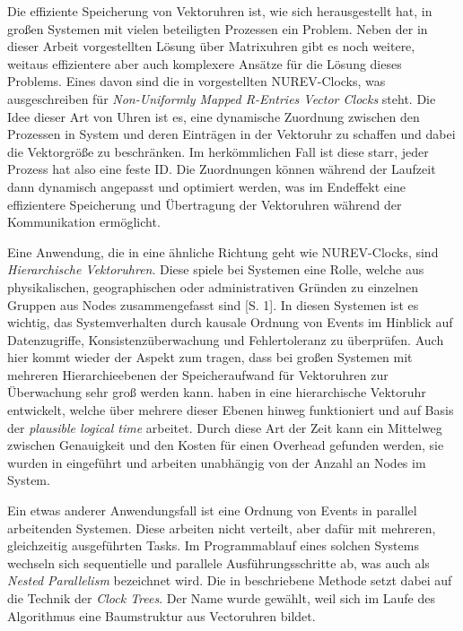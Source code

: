 Die effiziente Speicherung von Vektoruhren ist, wie sich herausgestellt hat, in großen Systemen mit vielen beteiligten Prozessen ein Problem. Neben der in dieser Arbeit vorgestellten Lösung über Matrixuhren gibt es noch weitere, weitaus effizientere aber auch komplexere Ansätze für die Lösung dieses Problems. Eines davon sind die in \cite{Gidenstam2004} vorgestellten NUREV-Clocks, was ausgeschreiben für \textit{Non-Uniformly Mapped R-Entries Vector Clocks} steht. Die Idee dieser Art von Uhren ist es, eine dynamische Zuordnung zwischen den Prozessen in System und deren Einträgen in der Vektoruhr zu schaffen und dabei die Vektorgröße zu beschränken. Im herkömmlichen Fall ist diese starr, jeder Prozess hat also eine feste ID. Die Zuordnungen können während der Laufzeit dann dynamisch angepasst und optimiert werden, was im Endeffekt eine effizientere Speicherung und Übertragung der Vektoruhren während der Kommunikation ermöglicht.

Eine Anwendung, die in eine ähnliche Richtung geht wie NUREV-Clocks, sind \textit{Hierarchische Vektoruhren}. Diese spiele bei Systemen eine Rolle, welche aus physikalischen, geographischen oder administrativen Gründen zu einzelnen Gruppen aus Nodes zusammengefasst sind \cite{Khotimsky1999}[S. 1]. In diesen Systemen ist es wichtig, das Systemverhalten durch kausale Ordnung von Events im Hinblick auf Datenzugriffe, Konsistenzüberwachung und Fehlertoleranz zu überprüfen. Auch hier kommt wieder der Aspekt zum tragen, dass bei großen Systemen mit mehreren Hierarchieebenen der Speicheraufwand für Vektoruhren zur Überwachung sehr groß werden kann.  haben in  \cite{Khotimsky1999} eine hierarchische Vektoruhr entwickelt, welche über mehrere dieser Ebenen hinweg funktioniert und auf Basis der \textit{plausible logical time} arbeitet. Durch diese Art der Zeit kann ein Mittelweg zwischen Genauigkeit und den Kosten für einen Overhead gefunden werden, sie wurden in \cite{torres1999plausible} eingeführt und arbeiten unabhängig von der Anzahl an Nodes im System.

Ein etwas anderer Anwendungsfall ist eine Ordnung von Events in parallel arbeitenden Systemen. Diese arbeiten nicht verteilt, aber dafür mit mehreren, gleichzeitig ausgeführten Tasks. Im Programmablauf eines solchen Systems wechseln sich sequentielle und parallele Ausführungsschritte ab, was auch als \textit{Nested Parallelism} bezeichnet wird. Die in \cite{Audenaert1997} beschriebene Methode setzt dabei auf die Technik der \textit{Clock Trees}. Der Name wurde gewählt, weil sich im Laufe des Algorithmus eine Baumstruktur aus Vectoruhren bildet.


